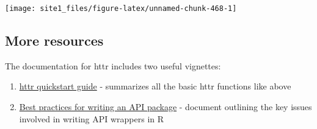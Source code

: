 \documentclass[]{book}
\newenvironment{Shaded}{\begin{snugshade}}{\end{snugshade}}
\newcommand{\KeywordTok}[1]{\textcolor[rgb]{0.13,0.29,0.53}{\textbf{#1}}}
\newcommand{\DataTypeTok}[1]{\textcolor[rgb]{0.13,0.29,0.53}{#1}}
\newcommand{\DecValTok}[1]{\textcolor[rgb]{0.00,0.00,0.81}{#1}}
\newcommand{\StringTok}[1]{\textcolor[rgb]{0.31,0.60,0.02}{#1}}
\newcommand{\CommentTok}[1]{\textcolor[rgb]{0.56,0.35,0.01}{\textit{#1}}}
\newcommand{\OperatorTok}[1]{\textcolor[rgb]{0.81,0.36,0.00}{\textbf{#1}}}
\newcommand{\NormalTok}[1]{#1}
\providecommand{\tightlist}{%
  \setlength{\itemsep}{0pt}\setlength{\parskip}{0pt}}
\begin{document}
\begin{Shaded}
\end{Shaded}

\begin{center}\texttt{[image: site1\_files/figure-latex/unnamed-chunk-468-1]} \end{center}

\subsection{More resources}\label{more-resources-1}

The documentation for httr includes two useful vignettes:

\begin{enumerate}
\def\labelenumi{\arabic{enumi}.}
\tightlist
\item
  \href{https://cran.r-project.org/web/packages/httr/vignettes/quickstart.html}{httr
  quickstart guide} - summarizes all the basic httr functions like above
\item
  \href{https://cran.r-project.org/web/packages/httr/vignettes/api-packages.html}{Best
  practices for writing an API package} - document outlining the key
  issues involved in writing API wrappers in R
\end{enumerate}
\end{document}
